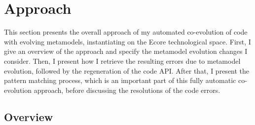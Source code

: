 \section{Approach}\label{approach}

This section presents the overall approach of my automated co-evolution of code with evolving metamodels,  instantiating on the Ecore technological space. First, I give an overview of the approach and specify the metamodel evolution changes I consider. 
%
Then, I present how I retrieve the resulting errors due to metamodel evolution, followed by the regeneration of the code API. 
After that, I present the pattern matching process, which is an important part of this fully automatic co-evolution approach, before discussing the resolutions of the code errors. 

\subsection{Overview}
\label{Overview}

